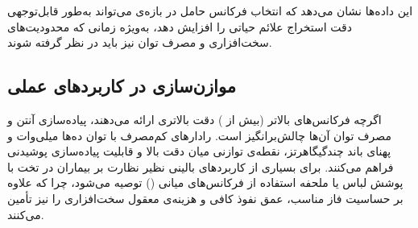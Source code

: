 این داده‌ها نشان می‌دهد که انتخاب فرکانس حامل در بازه‌ی  می‌تواند به‌طور قابل‌توجهی دقت استخراج علائم حیاتی را افزایش دهد، به‌ویژه زمانی که محدودیت‌های سخت‌افزاری و مصرف توان نیز باید در نظر گرفته شوند.

\subsection{موازن‌سازی در کاربردهای عملی}
اگرچه فرکانس‌های بالاتر (بیش از ) دقت بالاتری ارائه می‌دهند، پیاده‌سازی آنتن و مصرف توان آن‌ها چالش‌برانگیز است. رادارهای کم‌مصرف با توان ده‌ها میلی‌وات و پهنای باند چندگیگاهرتز، نقطه‌ی توازنی میان دقت بالا و قابلیت پیاده‌سازی پوشیدنی فراهم می‌کنند. برای بسیاری از کاربردهای بالینی نظیر نظارت بر بیماران در تخت با پوشش لباس یا ملحفه استفاده از فرکانس‌های میانی () توصیه می‌شود، چرا که علاوه بر حساسیت فاز مناسب، عمق نفوذ کافی و هزینه‌ی معقول سخت‌افزاری را نیز تأمین می‌کنند.
